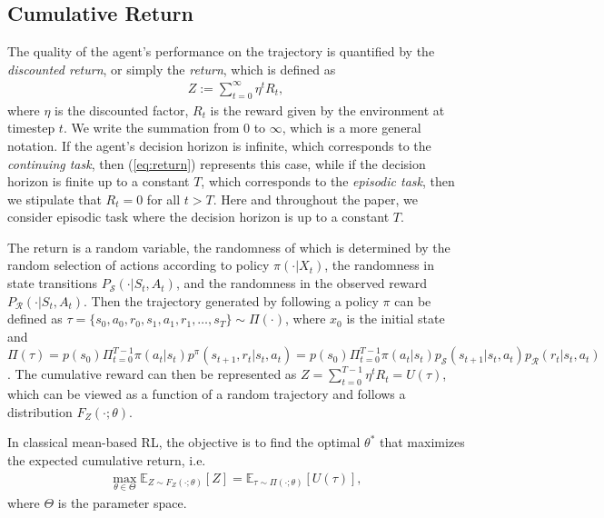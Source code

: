 \subsection{Cumulative Return}
The quality of the agent's performance on the trajectory is quantified by the \textit{discounted return}, or simply the \textit{return}, which is defined as
\begin{align} \label{eq:return}
    Z:=\sum_{t=0}^{\infty}\eta^t R_t,
\end{align}
where $\eta$ is the discounted factor, $R_t$ is the reward given by the environment at timestep $t$. We write the summation from $0$ to $\infty$, which is a more general notation. If the agent's decision horizon is infinite, which corresponds to the \textit{continuing task}, then (\ref{eq:return}) represents this case, while if the decision horizon is finite up to a constant $T$, which corresponds to the \textit{episodic task}, then we stipulate that $R_t=0$ for all $t>T$. Here and throughout the paper, we consider episodic task where the decision horizon is up to a constant $T$.

The return is a random variable, the randomness of which is determined by the random selection of actions according to policy $\pi(\cdot|X_t)$, the randomness in state transitions $P_{\mathcal{S}}(\cdot|S_t,A_t)$, and the randomness in the observed reward $P_{\mathcal{R}}(\cdot|S_t, A_t)$. Then the trajectory generated by following a policy $\pi$ can be defined as $\tau=\{s_0,a_0,r_0,s_1,a_1,r_1,\dots,s_T\}\sim\Pi(\cdot)$, where $x_0$ is the initial state and $\Pi(\tau)=p(s_0)\Pi_{t=0}^{T-1}\pi(a_t|s_t)p^{\pi}(s_{t+1},r_t|s_t,a_t)=p(s_0)\Pi_{t=0}^{T-1}\pi(a_t|s_t)p_{\mathcal{S}}(s_{t+1}|s_t,a_t)p_{\mathcal{R}}(r_t|s_t,a_t)$. The cumulative reward can then be represented as $Z=\sum_{t=0}^{T-1}\eta^tR_{t}=U(\tau)$, which can be viewed as a function of a random trajectory and follows a distribution $F_{Z}(\cdot;\theta)$.

In classical mean-based RL, the objective is to find the optimal $\theta^*$ that maximizes the expected cumulative return, i.e.
\begin{align} \label{eq:mean}
    \max_{\theta \in \Theta}\mathbb{E}_{Z\sim F_{Z}(\cdot;\theta)}[Z]=\mathbb{E}_{\tau\sim \Pi(\cdot;\theta)}[U(\tau)],
\end{align}
where $\Theta$ is the parameter space.

